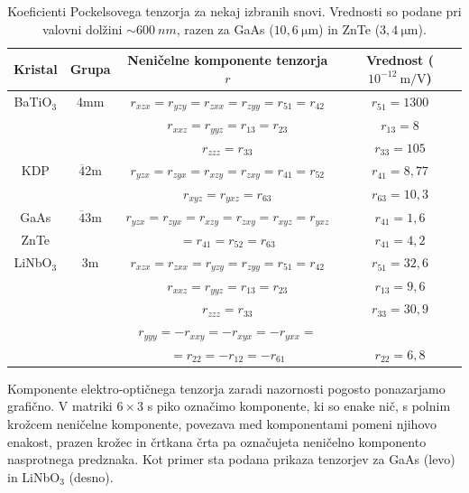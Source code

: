 \begin{table}[ht]
 \centering
\begin{tabular}{|c|c|c|c|} \hline  
      Kristal & Grupa & Neničelne komponente tenzorja $r$ & Vrednost ($10^{-12}~\si{\m/\V}$)\\ \hline
      BaTiO$_3$\index{BaTiO$_3$} & 4mm & $r_{xzx} = r_{yzy} = r_{zxx} = r_{zyy} = 
      r_{51} = r_{42}$  &
	    $r_{51} = 1300$ \\
	      & & $r_{xxz} = r_{yyz} = r_{13} = r_{23}$ &  $r_{13} = 8$ \\
	      & & $r_{zzz} = r_{33}$ & $r_{33} = 105$ \\ \hline
      KDP\index{KDP} & 
      $\overline{4}$2m & $r_{yzx} = r_{zyx} = r_{xzy} = r_{zxy} = r_{41} = r_{52}$  &
	    $r_{41} = 8,77$ \\
	    & & $r_{xyz} = r_{yxz} = r_{63}$ &  $r_{63} = 10,3$ \\ \hline
      GaAs\index{GaAs}\index{ZnTe} &  $\overline{4}$3m&
	  $r_{yzx} = r_{zyx} = r_{xzy} = r_{zxy} = r_{xyz} = r_{yxz}$  & 
	   $r_{41} = 1,6$ \\
	ZnTe  & &   $= r_{41} = r_{52}=r_{63}$  & $r_{41} = 4,2$ 
	    \\ \hline
      LiNbO$_3$\index{LiNbO$_3$} & 3m & $r_{xzx} = r_{zxx} = r_{yzy} = r_{zyy} = r_{51} = r_{42}$  &
	    $r_{51} = 32,6$ \\
	     & & $r_{xxz} = r_{yyz} = r_{13} = r_{23}$ &  $r_{13} = 9,6$ \\
	      & & $r_{zzz} = r_{33}$ & $r_{33} = 30,9$ \\
	    & &  $r_{yyy} = - r_{xxy} = -r_{xyx} = -r_{yxx}  = $ & \\
	    & &  $=r_{22} =  -r_{12} =-r_{61} $  &
	    $r_{22}  = 6,8$ \\
\hline 
\end{tabular}
  \caption{Koeficienti Pockelsovega tenzorja za nekaj izbranih snovi. Vrednosti so podane 
  pri valovni dolžini $\sim 600~\si{nm}$, razen za GaAs ($10,6~\si{\micro\metre}$) in 
  ZnTe ($3,4~\si{\micro\metre}$).}
\label{table:Pockels}
\end{table}
\begin{remark}
Komponente elektro-optičnega tenzorja zaradi nazornosti pogosto ponazarjamo grafično. V matriki $6\times 3$
s piko označimo komponente, ki so enake nič, s polnim krožcem neničelne komponente, povezava med 
komponentami pomeni njihovo enakost, prazen krožec in črtkana črta pa označujeta 
neničelno komponento nasprotnega predznaka. Kot primer sta podana prikaza tenzorjev za 
GaAs (levo) in  LiNbO$_3$ (desno).
\begin{figure}[ht]
\centering
\def\svgwidth{20truemm} 
\qquad \qquad
\def\svgwidth{20truemm} 

\end{figure}
\end{remark}

